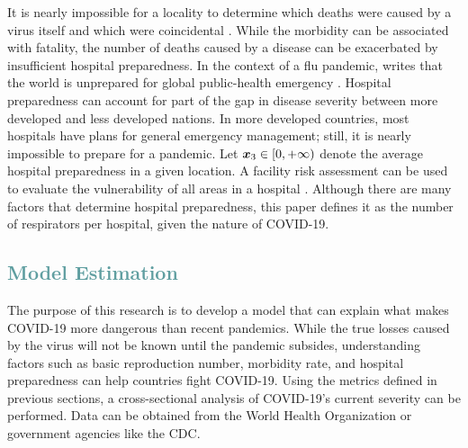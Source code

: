 \documentclass[12pt]{article}
\begin{document}
It is nearly impossible for a locality to determine which deaths were caused by a virus itself and which were coincidental \cite{diseaseControl}. 
While the morbidity can be associated with fatality, the number of deaths caused by a disease can be exacerbated by insufficient hospital preparedness.
In the context of a flu pandemic, \citeauthor{fineberg_2014} writes that the world is unprepared for global public-health emergency \citeyear{fineberg_2014}. Hospital preparedness can account for part of the gap in disease severity between more developed and less developed nations. In more developed countries, most hospitals have plans for general emergency management; still, it is nearly impossible to prepare for a pandemic. Let $\boldsymbol{x}_3 \in [0, +\infty)$ denote the average hospital preparedness in a given location. A facility risk assessment can be used to evaluate the vulnerability of all areas in a hospital \cite{hosPreparedness}. Although there are many factors that determine hospital preparedness, this paper defines it as the number of respirators per hospital, given the nature of COVID-19.



\textcolor{CadetBlue}{\section{Model Estimation}}

The purpose of this research is to develop a model that can explain what makes COVID-19 more dangerous than recent pandemics. While the true losses caused by the virus will not be known until the pandemic subsides, understanding factors such as basic reproduction number, morbidity rate, and hospital preparedness can help countries fight COVID-19. Using the metrics defined in previous sections, a cross-sectional analysis of COVID-19's current severity can be performed. Data can be obtained from the World Health Organization or government agencies like the CDC. 


\end{document}
